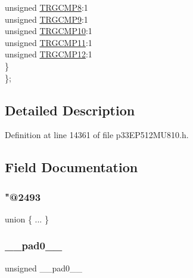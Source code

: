 \begin{DoxyCompactItemize}
\begin{tabbing}
\>\>unsigned \hyperlink{structtag_t_r_i_g2_b_i_t_s_a7d4f3ec40334f00592eb7247457e2fd6}{TRGCMP8}:1\\
\>\>unsigned \hyperlink{structtag_t_r_i_g2_b_i_t_s_a0001e7efb9031bef24e7a19100d11b0b}{TRGCMP9}:1\\
\>\>unsigned \hyperlink{structtag_t_r_i_g2_b_i_t_s_a768e63198a56962df16bcaaf9084f379}{TRGCMP10}:1\\
\>\>unsigned \hyperlink{structtag_t_r_i_g2_b_i_t_s_a8a82ad80802491f065113055f2a059e2}{TRGCMP11}:1\\
\>\>unsigned \hyperlink{structtag_t_r_i_g2_b_i_t_s_a2bc8969a57c3dbec6828f3bda9ebc1fd}{TRGCMP12}:1\\
\>\} \\
\}; \\

\end{tabbing}\end{DoxyCompactItemize}


\subsection{Detailed Description}


Definition at line 14361 of file p33\+E\+P512\+M\+U810.\+h.



\subsection{Field Documentation}
\mbox{\label{structtag_t_r_i_g2_b_i_t_s_a145441a7b8c6eabbdd5afd488fdf3681}} 
\subsubsection{\texorpdfstring{"@2493}{@2493}}
{\footnotesize\ttfamily union \{ ... \} }

\mbox{\label{structtag_t_r_i_g2_b_i_t_s_adf71f3d8410c1f1dbbc96680a92c49af}} 
\subsubsection{\texorpdfstring{\+\_\+\+\_\+pad0\+\_\+\+\_\+}{\_\_pad0\_\_}}
{\footnotesize\ttfamily unsigned \+\_\+\+\_\+pad0\+\_\+\+\_\+}



